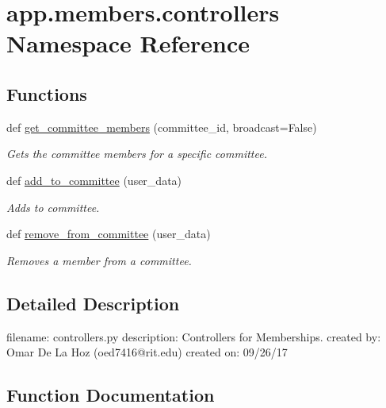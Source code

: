 \hypertarget{namespaceapp_1_1members_1_1controllers}{}\section{app.\+members.\+controllers Namespace Reference}
\label{namespaceapp_1_1members_1_1controllers}
\subsection*{Functions}
\begin{DoxyCompactItemize}
\item 
def \mbox{\hyperlink{namespaceapp_1_1members_1_1controllers_aa5952443267e1c04b380a533a4e4ea7f}{get\+\_\+committee\+\_\+members}} (committee\+\_\+id, broadcast=False)
\begin{DoxyCompactList}\small\item\em Gets the committee members for a specific committee. \end{DoxyCompactList}\item 
def \mbox{\hyperlink{namespaceapp_1_1members_1_1controllers_a8999f221f1849949968973c73a4ff409}{add\+\_\+to\+\_\+committee}} (user\+\_\+data)
\begin{DoxyCompactList}\small\item\em Adds to committee. \end{DoxyCompactList}\item 
def \mbox{\hyperlink{namespaceapp_1_1members_1_1controllers_a76a53b46e9b3997b5fac18a82280fce2}{remove\+\_\+from\+\_\+committee}} (user\+\_\+data)
\begin{DoxyCompactList}\small\item\em Removes a member from a committee. \end{DoxyCompactList}\end{DoxyCompactItemize}


\subsection{Detailed Description}
\begin{DoxyVerb}filename: controllers.py
description: Controllers for Memberships.
created by: Omar De La Hoz (oed7416@rit.edu)
created on: 09/26/17
\end{DoxyVerb}
 

\subsection{Function Documentation}
\mbox{\label{namespaceapp_1_1members_1_1controllers_a8999f221f1849949968973c73a4ff409}} 
